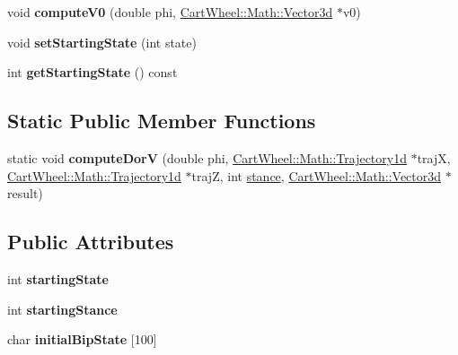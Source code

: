 \begin{DoxyCompactItemize}
\item 
\hypertarget{classCartWheel_1_1Core_1_1SimBiController_a477575344d771e492c1226f108fd3d92}{
void {\bfseries computeV0} (double phi, \hyperlink{classCartWheel_1_1Math_1_1Vector3d}{CartWheel::Math::Vector3d} $\ast$v0)}
\label{classCartWheel_1_1Core_1_1SimBiController_a477575344d771e492c1226f108fd3d92}

\item 
\hypertarget{classCartWheel_1_1Core_1_1SimBiController_a76be2604ba35a55ee3122c5264270b02}{
void {\bfseries setStartingState} (int state)}
\label{classCartWheel_1_1Core_1_1SimBiController_a76be2604ba35a55ee3122c5264270b02}

\item 
\hypertarget{classCartWheel_1_1Core_1_1SimBiController_adac6695d58830214605ca87ab8e4eb02}{
int {\bfseries getStartingState} () const }
\label{classCartWheel_1_1Core_1_1SimBiController_adac6695d58830214605ca87ab8e4eb02}

\end{DoxyCompactItemize}
\subsection*{Static Public Member Functions}
\begin{DoxyCompactItemize}
\item 
\hypertarget{classCartWheel_1_1Core_1_1SimBiController_a814f4e888463145d8b48464551c6c0ab}{
static void {\bfseries computeDorV} (double phi, \hyperlink{classCartWheel_1_1Math_1_1GenericTrajectory}{CartWheel::Math::Trajectory1d} $\ast$trajX, \hyperlink{classCartWheel_1_1Math_1_1GenericTrajectory}{CartWheel::Math::Trajectory1d} $\ast$trajZ, int \hyperlink{classCartWheel_1_1Core_1_1SimBiController_a5f8ee7481e35f496d5a32c412dcecad1}{stance}, \hyperlink{classCartWheel_1_1Math_1_1Vector3d}{CartWheel::Math::Vector3d} $\ast$result)}
\label{classCartWheel_1_1Core_1_1SimBiController_a814f4e888463145d8b48464551c6c0ab}

\end{DoxyCompactItemize}
\subsection*{Public Attributes}
\begin{DoxyCompactItemize}
\item 
\hypertarget{classCartWheel_1_1Core_1_1SimBiController_a5dc5d8b0064f5543bc366670b01b5654}{
int {\bfseries startingState}}
\label{classCartWheel_1_1Core_1_1SimBiController_a5dc5d8b0064f5543bc366670b01b5654}

\item 
\hypertarget{classCartWheel_1_1Core_1_1SimBiController_ab120e326313be3af49b59cf497199643}{
int {\bfseries startingStance}}
\label{classCartWheel_1_1Core_1_1SimBiController_ab120e326313be3af49b59cf497199643}

\item 
\hypertarget{classCartWheel_1_1Core_1_1SimBiController_a4db28106350b0015d7aab198d5d5508c}{
char {\bfseries initialBipState} \mbox{[}100\mbox{]}}
\label{classCartWheel_1_1Core_1_1SimBiController_a4db28106350b0015d7aab198d5d5508c}

\end{DoxyCompactItemize}
